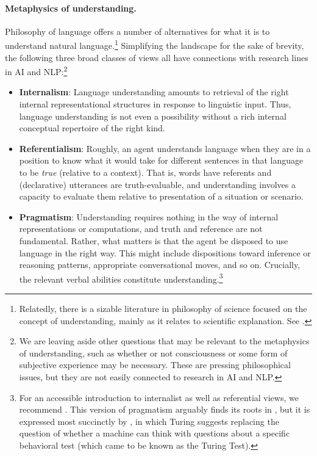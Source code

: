 \paragraph{Metaphysics of understanding.} 

Philosophy of language offers a number of alternatives for what it is to understand natural language.\footnote{Relatedly, there is a sizable literature in philosophy of science focused on the concept of understanding, mainly as it relates to scientific explanation. See \citet{grimm2021understanding}.} Simplifying the landscape for the sake of brevity, the following three broad classes of views all have connections with research lines in AI and NLP:\footnote{We are leaving aside other questions that may be relevant to the metaphysics of understanding, such as whether or not consciousness or some form of subjective experience may be necessary. These are pressing philosophical issues, but they are not easily connected to research in AI and NLP.}

\begin{itemize}
    \item \textbf{Internalism}: Language understanding amounts to retrieval of the right internal representational structures in response to linguistic input. Thus, language understanding is not even a possibility without a rich internal conceptual repertoire of the right kind.
    \item \textbf{Referentialism}: Roughly, an agent understands language when they are in a position to know what it would take for different sentences in that language to be \textit{true} (relative to a context). That is, words have referents and (declarative) utterances are truth-evaluable, and understanding involves a capacity to evaluate them relative to presentation of a situation or scenario.
    \item \textbf{Pragmatism}: Understanding requires nothing in the way of internal representations or computations, and truth and reference are not fundamental. Rather, what matters is that the agent be disposed to use language in the right way. This might include dispositions toward inference or reasoning patterns, appropriate conversational moves, and so on. Crucially, the relevant verbal abilities constitute understanding.\footnote{For an accessible introduction to internalist as well as referential views, we recommend \citet{elbourne2011meaning}. This version of pragmatism arguably finds its roots in \citet{wittgenstein1953philosophical}, but it is expressed most succinctly by \citet{turing1950computing}, in which Turing suggests replacing the question of whether a machine can think with questions about a specific behavioral test (which came to be known as the Turing Test).}
\end{itemize}

